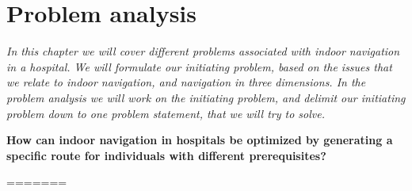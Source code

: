 \chapter{Problem analysis}

\textit{In this chapter we will cover different problems associated with indoor navigation in a hospital. We will formulate our initiating problem, based on the issues that we relate to indoor navigation, and navigation in three dimensions. In the problem analysis we will work on the initiating problem, and delimit our initiating problem down to one problem statement, that we will try to solve.
}

\textbf{How can indoor navigation in hospitals be optimized by generating a specific route for individuals with different prerequisites?}





%
=======
%

